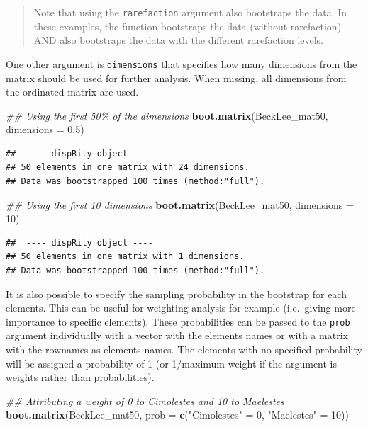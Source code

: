 \documentclass[
]{book}
\newenvironment{Shaded}{\begin{snugshade}}{\end{snugshade}}
\newcommand{\CommentTok}[1]{\textcolor[rgb]{0.56,0.35,0.01}{\textit{#1}}}
\newcommand{\DataTypeTok}[1]{\textcolor[rgb]{0.13,0.29,0.53}{#1}}
\newcommand{\DecValTok}[1]{\textcolor[rgb]{0.00,0.00,0.81}{#1}}
\newcommand{\FloatTok}[1]{\textcolor[rgb]{0.00,0.00,0.81}{#1}}
\newcommand{\KeywordTok}[1]{\textcolor[rgb]{0.13,0.29,0.53}{\textbf{#1}}}
\newcommand{\NormalTok}[1]{#1}
\newcommand{\StringTok}[1]{\textcolor[rgb]{0.31,0.60,0.02}{#1}}
\begin{document}
\begin{quote}
Note that using the \texttt{rarefaction} argument also bootstraps the data. In these examples, the function bootstraps the data (without rarefaction) AND also bootstraps the data with the different rarefaction levels.
\end{quote}

One other argument is \texttt{dimensions} that specifies how many dimensions from the matrix should be used for further analysis.
When missing, all dimensions from the ordinated matrix are used.

\begin{Shaded}
\begin{Highlighting}[]
\CommentTok{\#\# Using the first 50\% of the dimensions}
\KeywordTok{boot.matrix}\NormalTok{(BeckLee\_mat50, }\DataTypeTok{dimensions =} \FloatTok{0.5}\NormalTok{)}
\end{Highlighting}
\end{Shaded}

\begin{verbatim}
##  ---- dispRity object ---- 
## 50 elements in one matrix with 24 dimensions.
## Data was bootstrapped 100 times (method:"full").
\end{verbatim}

\begin{Shaded}
\begin{Highlighting}[]
\CommentTok{\#\# Using the first 10 dimensions}
\KeywordTok{boot.matrix}\NormalTok{(BeckLee\_mat50, }\DataTypeTok{dimensions =} \DecValTok{10}\NormalTok{)}
\end{Highlighting}
\end{Shaded}

\begin{verbatim}
##  ---- dispRity object ---- 
## 50 elements in one matrix with 1 dimensions.
## Data was bootstrapped 100 times (method:"full").
\end{verbatim}

It is also possible to specify the sampling probability in the bootstrap for each elements.
This can be useful for weighting analysis for example (i.e.~giving more importance to specific elements).
These probabilities can be passed to the \texttt{prob} argument individually with a vector with the elements names or with a matrix with the rownames as elements names.
The elements with no specified probability will be assigned a probability of 1 (or 1/maximum weight if the argument is weights rather than probabilities).

\begin{Shaded}
\begin{Highlighting}[]
\CommentTok{\#\# Attributing a weight of 0 to Cimolestes and 10 to Maelestes}
\KeywordTok{boot.matrix}\NormalTok{(BeckLee\_mat50,}
            \DataTypeTok{prob =} \KeywordTok{c}\NormalTok{(}\StringTok{"Cimolestes"}\NormalTok{ =}\StringTok{ }\DecValTok{0}\NormalTok{, }\StringTok{"Maelestes"}\NormalTok{ =}\StringTok{ }\DecValTok{10}\NormalTok{))}
\end{Highlighting}
\end{Shaded}
\end{document}
